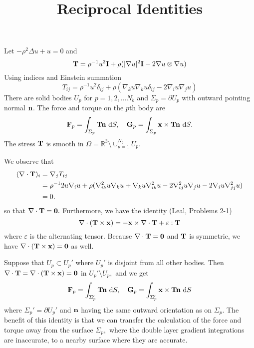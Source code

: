 \documentclass[preprint,11pt]{article}
\title{{\bf Reciprocal Identities }}
\begin{document}
\maketitle
\everymath{\displaystyle}

\topmargin=-30pt
\Large
\noindent


Let $-\rho^2 \Delta u + u = 0$ and 
\begin{equation}
{\bf T} = \rho^{-1} u^2 {\bf I} + \rho(|\nabla u|^2 {\bf I} - 2 \nabla u \otimes \nabla u)
\end{equation}
Using indices and Einstein summation 
\begin{equation}
 T_{ij} = \rho^{-1} u^2 \delta_{ij} + \rho(\nabla_k u \nabla_k u \delta_{ij} - 2 \nabla_i u \nabla_j u)
\end{equation}
There are solid bodies $U_p$ for $p = 1, 2, \dots N_b$ and $\Sigma_p = \partial U_p$ 
with outward pointing normal ${\bf n}$.
The force and torque on the $p$th body are  
\begin{equation}
{\bf F}_p = \int_{\Sigma_p} {\bf T} {\bf n} \, \dif S,\quad 
{\bf G}_p = \int_{\Sigma_p} {\bf x} \times {\bf T} {\bf n} \, \dif S.
\end{equation}
The stress ${\bf T}$ is smooth in $\Omega = \mathbb{R}^3 \setminus \cup_{p=1}^{N_b} U_p$.

We observe that 
\begin{align*}
(\nabla \cdot {\bf T})_i &= 
\nabla_j   T_{ij} \\
&= \rho^{-1} 2u \nabla_i u + \rho(\nabla_{ik}^2 u \nabla_k u + \nabla_k u \nabla_{ik}^2 u - 2 \nabla_{ij}^2 u \nabla_j u 
- 2 \nabla_i u \nabla_{jj}^2 u )\\
&=0. 
\end{align*}
so that $\nabla \cdot {\bf T} = {\bf 0}.$
Furthermore, we have the  identity (Leal, Problems 2-1)
\begin{equation}
\nabla \cdot ({\bf T} \times {\bf x}) = - {\bf x} \times \nabla \cdot {\bf T} + \varepsilon : {\bf T}
\end{equation}
where $\varepsilon$ is the alternating tensor. Because $\nabla \cdot {\bf T} = {\bf 0}$ and ${\bf T}$ is 
symmetric, we have $\nabla \cdot ({\bf T} \times {\bf x}) = {\bf 0}$ as well. 

Suppose that $U_p \subset U_p'$ where $U_p'$ is disjoint from all 
other bodies. 
Then $\nabla \cdot {\bf T} = \nabla \cdot ({\bf T} \times {\bf x}) = {\bf 0}$ in $U_p'\setminus U_p,$ and 
we get 
\begin{equation}
{\bf F}_p = \int_{\Sigma_p'} {\bf T} {\bf n} \, \dif S,\quad 
{\bf G}_p = \int_{\Sigma_p'} {\bf x} \times {\bf T} {\bf n} \, \dif S
\end{equation}
where $\Sigma_p' = \partial U_p'$ and 
${\bf n}$ having the same outward orientation as on $\Sigma_p$. The benefit
of this identity is that we can transfer the calculation of the force and torque
away from the surface $\Sigma_p,$ where the double layer gradient integrations are
inaccurate, to a nearby surface where they are accurate. 
\end{document}
